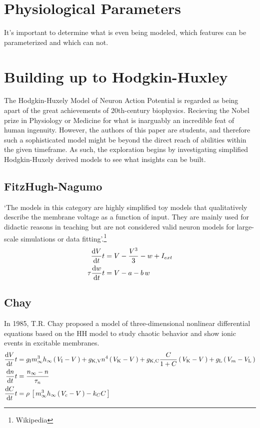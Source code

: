 \documentclass[../../Orator.tex]{subfiles}
\begin{document}
\newpage
\section{Physiological Parameters}
It's important to determine what is even being modeled, which features can be parameterized and which can not.


\newpage
\section{Building up to Hodgkin-Huxley}

The Hodgkin-Huxely Model of Neuron Action Potential is regarded as being apart of the great achievements of 20th-century biophysics. Recieving the Nobel prize in Physiology or Medicine for what is inarguably an incredible feat of human ingenuity. However, the authors of this paper are students, and therefore such a sophisticated model might be beyond the direct reach of abilities within the given timeframe. 
As such, the exploration begins by investigating simplified Hodgkin-Huxely derived models to see what insights can be built.

\subsection{FitzHugh-Nagumo}
`The models in this category are highly simplified toy models that qualitatively describe the membrane voltage as a function of input. They are mainly used for didactic reasons in teaching but are not considered valid neuron models for large-scale simulations or data fitting'.\footnote{Wikipedia}
\begin{subequations}\label{eq:FitNagSys}
    \begin{align}
        \ode{V}{t} &= V - \frac{V^3}{3} - w + I_{ext} \\ 
        \tau\ode{w}{t} &= V - a - b\,w 
    \end{align}
\end{subequations}


\subsection{Chay}
In 1985, T.R. Chay proposed a model of three-dimensional nonlinear differential equations based on the HH model to study chaotic behavior and show ionic events in excitable membranes. 
\begin{subequations}\label{eq:ChaySys}
    \begin{align}
        \ode{V}{t} &= g_\rmm{I}  m^3_\infty h_\infty \br{V_\rmm{I} - V} + g_\rmm{K, V} n^4 \br{V_\rmm{K} - V} + g_\rmm{K, C}  \frac{C}{1+C}\br{V_\rmm{K} - V} + g_\rmm{L} \br{V_m - V_\rmm{L}} \\ 
        \ode{n}{t} &= \frac{n_\infty - n}{\tau_n} \\
        \ode{C}{t} &= \rho \, \sbr{m^3_\infty h_\infty \br{V_c - V} - k_C C}
    \end{align}
\end{subequations}
\end{document}
